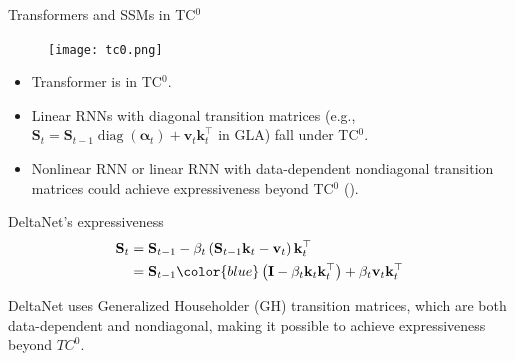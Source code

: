 

\begin{frame}{Transformers and SSMs in TC$^0$}
    \begin{figure}
        \centering
        \texttt{[image: tc0.png]}
    \end{figure}
    \vspace{-2mm}
\begin{itemize}
    \item Transformer is in TC$^0$.
    \item Linear RNNs with {\color{red}diagonal transition matrices} (e.g., $\mathbf{S}_t = \mathbf{S}_{t-1} \operatorname{diag}(\boldsymbol{\alpha}_t) + \mathbf{v}_t \mathbf{k}_t^\top$ in GLA) fall under TC$^0$.
    \item {\color{red} Nonlinear RNN} or linear RNN with {\color{red} data-dependent nondiagonal transition matrices} could achieve expressiveness beyond TC$^0$ (\cite{Merrill2024TheIO}).
\end{itemize}
\end{frame}

\begin{frame}{DeltaNet's expressiveness}
    \begin{align*}
    \mathbf{S}_t &= \mathbf{S}_{t-1} - \beta_t \left(\mathbf{S}_{t-1} \mathbf{k}_t - \mathbf{v}_t\right) \mathbf{k}_t^\top \\
    &= \mathbf{S}_{t-1} {\color{blue}\left(\mathbf{I} - \beta_t \mathbf{k}_t \mathbf{k}_t^\top\right)} + \beta_t \mathbf{v}_t \mathbf{k}_t^\top
    \end{align*}

    DeltaNet uses {\color{blue} Generalized Householder} (GH) transition matrices, which are both {\color{red}data-dependent} and {\color{red}nondiagonal}, making it possible to achieve expressiveness beyond $TC^0$.
\end{frame}



